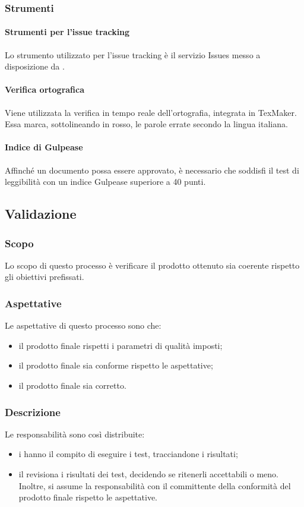 \subsubsection{Strumenti}
\paragraph{Strumenti per l'issue tracking}
Lo strumento utilizzato per l'issue tracking è il servizio Issues messo a disposizione da .
\paragraph{Verifica ortografica}
Viene utilizzata la verifica in tempo reale dell'ortografia, integrata in TexMaker. Essa marca,
sottolineando in rosso, le parole errate secondo la lingua italiana.
\paragraph{Indice di Gulpease}
Affinché un documento possa essere approvato, è necessario che soddisfi il test di leggibilità con un indice Gulpease superiore a 40 punti.
 \subsection{Validazione}
 \subsubsection{Scopo}
 Lo scopo di questo processo è verificare il prodotto ottenuto sia coerente rispetto gli obiettivi prefissati.
 \subsubsection{Aspettative}
 Le aspettative di questo processo sono che:
 \begin{itemize}
 	\item il prodotto finale rispetti i parametri di qualità imposti;
 	\item il prodotto finale sia conforme rispetto le aspettative;
 	\item il prodotto finale sia corretto.
 \end{itemize}
 \subsubsection{Descrizione}
 Le responsabilità sono così distribuite:
 \begin{itemize}
 	\item i \VERP{} hanno il compito di eseguire i test, tracciandone i risultati;
 	\item il \RESP{} revisiona i risultati dei test, decidendo se ritenerli accettabili o meno. Inoltre, si assume la responsabilità con il committente della conformità del prodotto finale rispetto le aspettative.
 \end{itemize}
